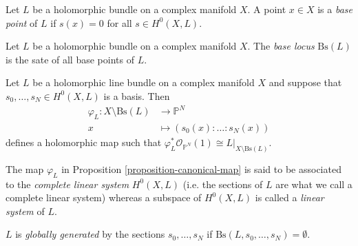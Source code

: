 \begin{definition}
\label{definition-base-point}
\begin{reference}
\cite[Definition 2.3.25]{huc}
\end{reference}
Let $L$ be a holomorphic bundle on a complex manifold $X$. A point $x \in X$ is
a {\it base point} of $L$ if $s(x)=0$ for all $s\in H^{0}(X,L)$. 
\end{definition}

\begin{definition}
\label{definition-base-locus}
\begin{reference}
\cite[Definition 2.3.25]{huc}
\end{reference}
Let $L$ be a holomorphic bundle on a complex manifold $X$. 
The {\it base locus} $\text{Bs}(L)$ is the sate of all base points of $L$.
\end{definition}

\begin{proposition}
\label{proposition-canonical-map}
\begin{reference}
\cite[Proposition 2.3.26]{huc}
\end{reference}
Let $L$ be a holomorphic line bundle on a complex manifold $X$ and suppose that
$s_0,\ldots,s_N\in H^{0}(X,L)$ is a basis. Then
\begin{align*}
\varphi_L: X\setminus\text{Bs}(L) &\longrightarrow \mathbb{P}^N \\
x &\longmapsto (s_0(x):\ldots:s_N(x))
\end{align*}
defines a holomorphic map such that $\varphi^*
_L\mathcal{O}_{\mathbb{P}^N}(1)\cong L|_{X\setminus\text{Bs}(L)}$.
\end{proposition}

\begin{definition}
\label{definition-linear-system}
\begin{reference}
\cite[p. 86]{huc}
\end{reference}
The map $\varphi_L$ in Proposition \ref{proposition-canonical-map} is said to be
associated to the {\it complete linear system} $H^{0}(X,L)$ (i.e. the sections
of $L$ are what we call a complete linear system) whereas a subspace of 
$H^{0}(X,L)$ is called a {\it linear system} of $L$.
\end{definition}

\begin{definition}
\label{definition-globally-generated}
\begin{reference}
\cite[p. 86]{huc}
\end{reference}
$L$ is {\it globally generated} by the sections $s_0,\ldots,s_N$ if
$\text{Bs}(L,s_0,\ldots,s_N)=\emptyset$.
\end{definition}

